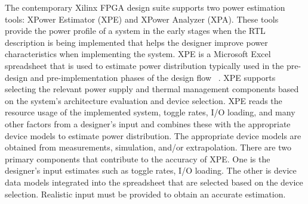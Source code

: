 %
%

The contemporary Xilinx FPGA design suite supports two power estimation tools: XPower Estimator (XPE) and  XPower Analyzer (XPA).
These tools provide the power profile of a system in the early stages when the RTL description is being implemented that helps the designer improve power characteristics when implementing the system.
XPE is a Microsoft Excel spreadsheet that is used to estimate power distribution typically used in the pre-design and pre-implementation phases of the design flow~\cite{XPowerEstimator2011} .
XPE supports selecting the relevant power supply and thermal management components based on the system's architecture evaluation and device selection.
XPE reads the resource usage of the implemented system, toggle rates, I/O loading, and many other factors from a designer's input and combines these with the appropriate device models to estimate power distribution.
The appropriate device models are obtained from measurements, simulation, and/or extrapolation.
There are two primary components that contribute to the accuracy of XPE.
One is the designer's input estimates such as toggle rates, I/O loading.
The other is device data models integrated into the spreadsheet that are selected based on the device selection.
Realistic input must be provided to obtain an accurate estimation.

